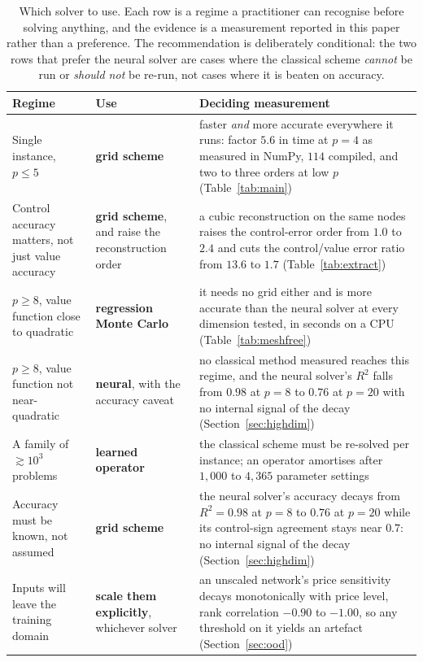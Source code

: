 %
\begin{table}[!tb]
\centering
\caption{Which solver to use. Each row is a regime a practitioner can recognise before solving
anything, and the evidence is a measurement reported in this paper rather than a preference. The
recommendation is deliberately conditional: the two rows that prefer the neural solver are cases
where the classical scheme \emph{cannot} be run or \emph{should not} be re-run, not cases where it
is beaten on accuracy.}
\label{tab:guide}
\small
\setlength{\tabcolsep}{3.2pt}
\begin{tabular}{@{}p{}p{}p{}@{}}
\toprule
Regime & Use & Deciding measurement \\
\midrule
Single instance, $p \le 5$ & \textbf{grid scheme} & faster \emph{and} more accurate everywhere it
runs: factor $5.6$ in time at $p=4$ as measured in NumPy, $114$ compiled, and two to three orders at
low $p$ (Table~\ref{tab:main}) \\
\addlinespace
Control accuracy matters, not just value accuracy & \textbf{grid scheme}, and raise the
reconstruction order & a cubic reconstruction on the same nodes raises the control-error order
from $1.0$ to $2.4$ and cuts the control/value error ratio from $13.6$ to $1.7$
(Table~\ref{tab:extract}) \\
\addlinespace
$p \ge 8$, value function close to quadratic & \textbf{regression Monte Carlo} & it needs no grid
either and is more accurate than the neural solver at every dimension tested, in seconds on a CPU
(Table~\ref{tab:meshfree}) \\
\addlinespace
$p \ge 8$, value function not near-quadratic & \textbf{neural}, with the accuracy caveat & no
classical method measured reaches this regime, and the neural solver's $R^2$ falls from $0.98$ at
$p=8$ to $0.76$ at $p=20$ with no internal signal of the decay
(Section~\ref{sec:highdim}) \\
\addlinespace
A family of $\gtrsim 10^3$ problems & \textbf{learned operator} & the classical scheme must be
re-solved per instance; an operator amortises after $1{,}000$ to $4{,}365$ parameter settings \\
\addlinespace
Accuracy must be known, not assumed & \textbf{grid scheme} & the neural solver's accuracy decays
from $R^2 = 0.98$ at $p=8$ to $0.76$ at $p=20$ while its control-sign agreement stays near $0.7$:
no internal signal of the decay (Section~\ref{sec:highdim}) \\
\addlinespace
Inputs will leave the training domain & \textbf{scale them explicitly}, whichever solver &
an unscaled network's price sensitivity decays monotonically with price level, rank correlation
$-0.90$ to $-1.00$, so any threshold on it yields an artefact (Section~\ref{sec:ood}) \\
\bottomrule
\end{tabular}
\end{table}
